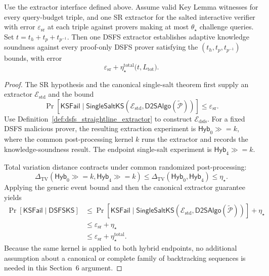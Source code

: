 \begin{theorem}
  \label{thm:duplex_sponge_fiat_shamir_straightline_knowledge_soundness}
  Use the extractor interface defined above.
  Assume valid Key Lemma witnesses for every query-budget triple, and one SR extractor
  for the salted interactive verifier with error $\varepsilon_{\mathrm{sr}}$ at each triple
  against provers making at most $\theta_{\star}$ challenge queries.
  Set $t=t_h+t_p+t_{p^{-1}}$. Then one DSFS extractor establishes adaptive
  knowledge soundness against every proof-only DSFS prover satisfying the
  $(t_h,t_p,t_{p^{-1}})$ bounds, with error
  \[
    \varepsilon_{\mathrm{sr}}
      +\eta_{\star}^{\mathrm{total}}
        \bigl(t,L_{\mathrm{tot}}\bigr).
  \]
  \leanok
\end{theorem}

\begin{proof}
  The SR hypothesis and the canonical single-salt theorem first supply an extractor
  $\mathcal E_{\mathrm{std}}$ and the bound
  \[
    \Pr[\mathsf{KSFail}\mid
      \mathsf{SingleSaltKS}(\mathcal E_{\mathrm{std}},
        \mathsf{D2SAlgo}(\widetilde{\mathcal P}))]
      \leq\varepsilon_{\mathrm{sr}}.
  \]
  Use Definition~\ref{def:dsfs_straightline_extractor} to construct
  $\mathcal E_{\mathrm{dsfs}}$.  For a fixed DSFS malicious prover, the resulting extraction
  experiment is $\mathsf{Hyb}_0\mathbin{\gg=}k$, where the common post-processing kernel $k$
  runs the extractor and records the knowledge-soundness result.  The endpoint single-salt
  experiment is $\mathsf{Hyb}_4\mathbin{\gg=}k$.

  Total variation distance contracts under common randomized post-processing:
  \[
    \Delta_{\mathrm{TV}}(\mathsf{Hyb}_0\mathbin{\gg=}k,
                         \mathsf{Hyb}_4\mathbin{\gg=}k)
      \leq
    \Delta_{\mathrm{TV}}(\mathsf{Hyb}_0,\mathsf{Hyb}_4)
      \leq\eta_{\star}.
  \]
  Applying the generic event bound and then the canonical extractor guarantee yields
  \begin{align*}
    \Pr[\mathsf{KSFail}\mid\mathsf{DSFSKS}]
      &\leq
        \Pr[\mathsf{KSFail}\mid
          \mathsf{SingleSaltKS}(\mathcal E_{\mathrm{std}},
            \mathsf{D2SAlgo}(\widetilde{\mathcal P}))]
          +\eta_{\star}\\
      &\leq \varepsilon_{\mathrm{sr}}+\eta_{\star}\\
      &\leq \varepsilon_{\mathrm{sr}}+\eta_{\star}^{\mathrm{total}}.
  \end{align*}
  Because the same kernel is applied to both hybrid endpoints, no additional assumption about a
  canonical or complete family of backtracking sequences is needed in this Section~6 argument.
  \leanok
\end{proof}
